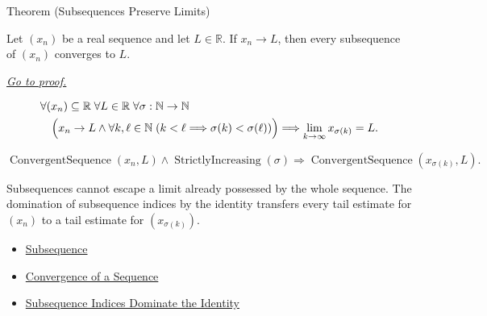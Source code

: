 
\begin{theorembox}{Theorem (Subsequences Preserve Limits)}
\begin{theorem}
\label{thm:subsequences-preserve-limits}
Let $(x_n)$ be a real sequence and let $L\in\mathbb{R}$. If $x_n\to L$,
then every subsequence of $(x_n)$ converges to $L$.

\smallskip
\noindent
\hyperref[prf:subsequences-preserve-limits]{\textit{Go to proof.}}
\end{theorem}
\end{theorembox}

\begin{remark*}
\[
\begin{aligned}
&\forall (x_n)\subseteq\mathbb{R}\;\forall L\in\mathbb{R}\;
\forall \sigma:\mathbb{N}\to\mathbb{N}\\
&\quad\Bigl(
  x_n\to L
  \land
  \forall k,\ell\in\mathbb{N}\;(k<\ell\Longrightarrow\sigma(k)<\sigma(\ell))
\Bigr)
\Longrightarrow
\lim_{k\to\infty}x_{\sigma(k)}=L.
\end{aligned}
\]
\end{remark*}

\begin{remark*}
\[
\operatorname{ConvergentSequence}(x_n,L)
\land
\operatorname{StrictlyIncreasing}(\sigma)
\Longrightarrow
\operatorname{ConvergentSequence}(x_{\sigma(k)},L).
\]
\end{remark*}

\begin{remark*}[Interpretation]
Subsequences cannot escape a limit already possessed by the whole sequence.
The domination of subsequence indices by the identity transfers every tail
estimate for $(x_n)$ to a tail estimate for $(x_{\sigma(k)})$.
\end{remark*}

\begin{dependencies}
\begin{itemize}
  \item \hyperref[def:subsequence]{Subsequence}
  \item \hyperref[def:convergent-sequence]{Convergence of a Sequence}
  \item \hyperref[thm:subsequence-indices-dominate-identity]{Subsequence Indices Dominate the Identity}
\end{itemize}
\end{dependencies}


